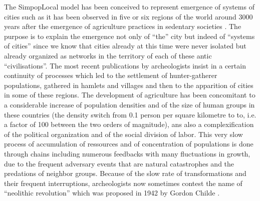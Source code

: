\documentclass[10pt]{article}
\begin{document}
The SimpopLocal model has been conceived to represent emergence of systems of cities such as it has been observed in five or six regions of the world around 3000 years after the emergence of agriculture practices in sedentary societies \citep{marcus2008ancient}. The purpose is to explain the emergence not only of ``the'' city but indeed of ``systems of cities'' since we know that cities already at this time were never isolated but already organized as networks in the territory of each of these antic ``civilisations''. The most recent publications by archeologists insist in a certain continuity of processes which led to the settlement of hunter-gatherer populations, gathered in hamlets and villages and then to the apparition of cities in some of these regions. The development of agriculture has been concomitant to a considerable increase of population densities and of the size of human groups in these countries (the density switch from 0.1 person per square kilometre to to, i.e. a factor of 100 between the two orders of magnitude), ans also a complexification of the political organization and of the social division of labor. This very slow process of accumulation of ressources and of concentration of populations is done through chains including numerous feedbacks with many fluctuations in growth, due to the frequent adversary events that are natural catastrophes and the predations of neighbor groups. Because of the slow rate of transformations and their frequent interruptions, archeologists now sometimes contest the name of ``neolithic revolution'' which was proposed in 1942 by Gordon Childe \citep[p. 159]{demoule2018histoire}.
\end{document}
